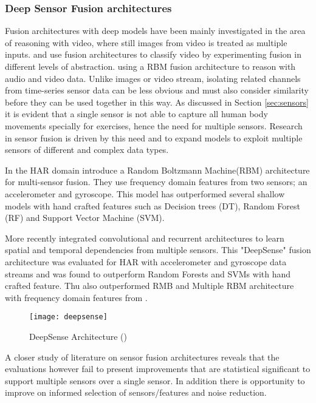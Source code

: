 \subsubsection{Deep Sensor Fusion architectures}
Fusion architectures with deep models have been mainly investigated in the area of reasoning with video, where still images from video is treated as multiple inputs.  and  use fusion architectures to classify video by experimenting fusion in different levels of abstraction.  using a RBM fusion architecture to reason with audio and video data. 
Unlike images or video stream, isolating related channels from time-series sensor data can be less obvious and must also consider similarity before they can be used together in this way. 
As discussed in Section \ref{sec:sensors} it is evident that a single sensor is not able to capture all human body movements specially for exercises, hence the need for multiple sensors. Research in sensor fusion is driven by this need and to expand models to exploit multiple sensors of different and complex data types. 

In the HAR domain  introduce a Random Boltzmann Machine(RBM) architecture for multi-sensor fusion. They use frequency domain features from two sensors; an accelerometer and gyroscope. This model has outperformed several shallow models with hand crafted features such as Decision trees (DT), Random Forest (RF) and Support Vector Machine (SVM). 

More recently  integrated  convolutional and recurrent architectures to learn spatial and temporal dependencies from multiple sensors. This "DeepSense" fusion architecture was evaluated for HAR with accelerometer and gyroscope data streams and was found to outperform Random Forests and SVMs with hand crafted feature. Thu also outperformed RMB and Multiple RBM architecture with frequency domain features from .
\begin{figure}[ht]
\centering
\texttt{[image: deepsense]}
\caption{DeepSense Architecture (\cite{yao2017deepsense})}
\label{fig:ds}
\end{figure}
A closer study of literature on sensor fusion architectures reveals that the evaluations however fail to present improvements that are statistical significant to support multiple sensors over a single sensor. In addition there is opportunity to improve on informed selection of sensors/features and noise reduction.  

